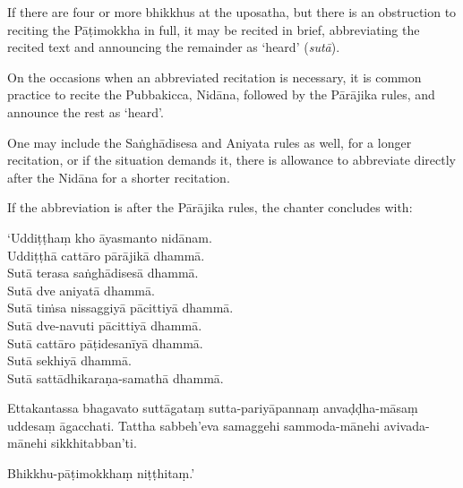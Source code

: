 If there are four or more bhikkhus at the uposatha, but there is an obstruction
to reciting the Pāṭimokkha in full, it may be recited in brief, abbreviating the
recited text and announcing the remainder as `heard' (\emph{sutā}).

On the occasions when an abbreviated recitation is necessary, it is common
practice to recite the Pubbakicca, Nidāna, followed by the Pārājika rules, and
announce the rest as `heard'.

One may include the Saṅghādisesa and Aniyata rules as well, for a longer
recitation, or if the situation demands it, there is allowance to abbreviate
directly after the Nidāna for a shorter recitation.

If the abbreviation is after the Pārājika rules, the chanter concludes with:

`Uddiṭṭhaṃ kho āyasmanto nidānam.\\
Uddiṭṭhā cattāro pārājikā dhammā.\\
Sutā terasa saṅghādisesā dhammā.\\
Sutā dve aniyatā dhammā.\\
Sutā tiṁsa nissaggiyā pācittiyā dhammā.\\
Sutā dve-navuti pācittiyā dhammā.\\
Sutā cattāro pāṭidesanīyā dhammā.\\
Sutā sekhiyā dhammā.\\
Sutā sattādhikaraṇa-samathā dhammā.

Ettakantassa bhagavato suttāgataṃ sutta-pariyāpannaṃ anvaḍḍha-māsaṃ uddesaṃ āgacchati.
Tattha sabbeh'eva samaggehi sammoda-mānehi avivada-mānehi sikkhitabban'ti.

Bhikkhu-pāṭimokkhaṃ niṭṭhitaṃ.'


